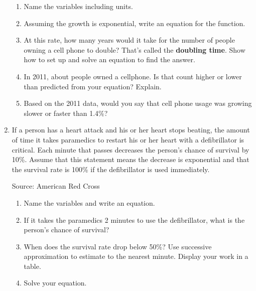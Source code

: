 \begin{enumerate}
\begin{enumerate}
\item Name the variables including units.  \vfill
\item Assuming the growth is exponential, write an equation for the function.  \vfill
\item At this rate, how many years would it take for the number of people owning a cell phone to double?  That's called the  \textbf{doubling time}.  Show how to set up and solve an equation to find the answer.  \vfill   \vfill
\item In 2011, about  people owned a cellphone.  Is that count higher or lower than predicted from your equation?  Explain.  \vfill
\item Based on the 2011 data, would you say that cell phone usage was growing slower or faster than 1.4\%?  \vfill
\end{enumerate}

\newpage %

\item  If a person has a heart attack and his or her heart stops beating, the amount of time it takes paramedics to restart his or her heart with a defibrillator is critical.  Each minute that passes decreases the person's chance of survival by 10\%.  Assume that this statement means the decrease is exponential and that the survival rate is 100\% if the defibrillator is used immediately. \hfill \begin{footnotesize} Source: American Red Cross \end{footnotesize}
\begin{enumerate}
\item Name the variables and write an equation. \vfill
\item If it takes the paramedics 2 minutes to use the defibrillator, what is the person's chance of survival? \vfill
\item When does the survival rate drop below 50\%? Use successive approximation to estimate to the nearest minute.  Display your work in a table. \vfill \vfill
\item Solve your equation. \vfill \vfill
\end{enumerate}  

\newpage %


\end{enumerate}
